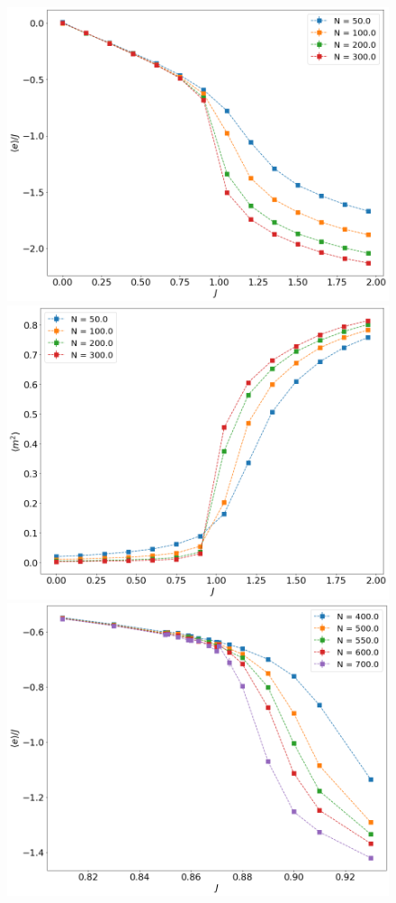  
 \begin{figure}[t]
	\centering
	\includegraphics[scale=0.23]{Images/3_energy_shortchains.png}
	\includegraphics[scale=0.23]{Images/3_magnetization2_shortchains.png} \\
	\includegraphics[scale=0.23]{Images/3_energy_longchains.png}

\end{figure}
